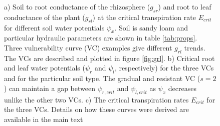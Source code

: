 \documentclass[utf8]{frontiersSCNS} %
\begin{document}
\begin{figure}[h]
    \caption{a) Soil to root conductance of the rhizosphere ($g_{sr}$) and root to leaf conductance of the plant ($g_{rl}$) at the critical transpiration rate $E_{crit}$ for different soil water potentials $\psi_x$. Soil is sandy loam and particular hydraulic parameters are shown in table \ref{tab:props}. Three vulnerability curve (VC) examples give different $g_{rl}$ trends. The VCs are described and plotted in figure \ref{fig:grl}. b) Critical root and leaf water potentials ($\psi_r$ and $\psi_l$, respectively) for the three VCs and for the particular soil type. The gradual and resistant VC ($s=2$) can maintain a gap between $\psi_{r,crit}$ and $\psi_{l,crit}$ as $\psi_x$ decreases unlike the other two VCs. c) The critical transpiration rates $E_{crit}$ for the three VCs. Details on how these curves were derived are available in the main text}
    \label{fig:gmax_Emax_psix}
\end{figure}
\end{document}
